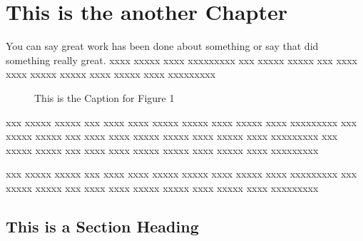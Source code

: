  
\chapter{This is the another Chapter}
 
You can say great work has been done about something \citep{Castleman98,Granlund95} or say that \citet{Holmes95} did something really great.
xxxx xxxxx xxxx xxxxxxxxx 
xxx xxxxx xxxxx xxx xxxx xxxx xxxxx xxxxx xxxx xxxxx xxxx xxxxxxxxx
 
\begin{figure}
\vspace{2.0in}
\caption{This is the Caption for Figure 1}
\end{figure}
 
xxx xxxxx xxxxx xxx xxxx xxxx xxxxx xxxxx xxxx xxxxx xxxx xxxxxxxxx
xxx xxxxx xxxxx xxx xxxx xxxx xxxxx xxxxx xxxx xxxxx xxxx xxxxxxxxx
xxx xxxxx xxxxx xxx xxxx xxxx xxxxx xxxxx xxxx xxxxx xxxx xxxxxxxxx
 

 
xxx xxxxx xxxxx xxx xxxx xxxx xxxxx xxxxx xxxx xxxxx xxxx xxxxxxxxx
xxx xxxxx xxxxx xxx xxxx xxxx xxxxx xxxxx xxxx xxxxx xxxx xxxxxxxxx
 
\section{This is a Section Heading}
 